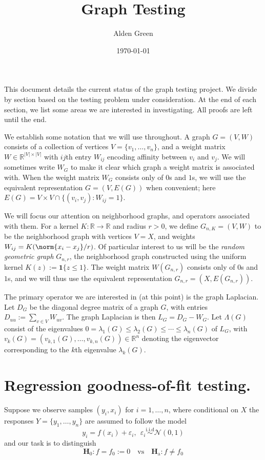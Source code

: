 \documentclass{article}
\newcommand{\Reals}{\mathbb{R}}
\newcommand{\abs}[1]{\left \lvert #1 \right \rvert}
\newcommand{\1}{\mathbf{1}}
\theoremstyle{alden}
\theoremstyle{aldenthm}
\theoremstyle{definition}
\theoremstyle{remark}
\begin{document}
\title{Graph Testing}
\author{Alden Green}
\date{\today}
\maketitle

This document details the current status of the graph testing project. We divide by section based on the testing problem under consideration. At the end of each section, we list some areas we are interested in investigating. All proofs are left until the end.

We establish some notation that we will use throughout. A graph $G = (V,W)$ consists of a collection of vertices $V = \{v_1,\ldots,v_n\}$, and a weight matrix $W \in \Reals^{\abs{V} \times \abs{V}}$ with $ij$th entry $W_{ij}$ encoding affinity between $v_i$ and $v_j$. We will sometimes write $W_G$ to make it clear which graph a weight matrix is associated with. When the weight matrix $W_G$ consists only of $0$s and $1$s, we will use the equivalent representation $G = (V,E(G))$ when convenient; here $E(G) = V \times V \cap \{(v_i,v_j): W_{ij} = 1\}$. 

We will focus our attention on neighborhood graphs, and operators associated with them. For a kernel $K:\Reals \to \Reals$ and radius $r > 0$, we define $G_{n,K}=(V,W)$ to be the neighborhood graph with vertices $V = X$, and weights $W_{ij} = K(\norm{x_i - x_j}/r)$. Of particular interest to us will be the \emph{random geometric graph} $G_{n,r}$, the neighborhood graph constructed using the uniform kernel $K(z) := \1\{z \leq 1\}$. The weight matrix $W(G_{n,r})$ consists only of $0$s and $1$s, and we will thus use the equivalent representation $G_{n,r} = (X,E(G_{n,r}))$.

The primary operator we are interested in (at this point) is the graph Laplacian. Let $D_G$ be the diagonal degree
matrix of a graph $G$, with entries $D_{uu} := \sum_{v \in V} W_{uv}$. The graph Laplacian is then $L_G = D_G - W_G$. Let $\Lambda(G)$ consist of the eigenvalues $0 = \lambda_1(G) \leq \lambda_2(G) \leq \cdots \leq \lambda_n(G)$ of $L_G$, with $v_k(G) = (v_{k,1}(G),\ldots,v_{k,n}(G)) \in \Reals^n$ denoting the eigenvector corresponding to the $k$th eigenvalue $\lambda_k(G)$.  

\section{Regression goodness-of-fit testing.}

Suppose we observe samples $(y_i,x_i)$ for $i = 1,\ldots,n$, where conditional on $X$ the responses $Y = \{y_1,\ldots,y_n\}$ are assumed to follow the model
\begin{equation}
\label{eqn:regression_known_variance}
y_i = f(x_i) + \varepsilon_i, ~~ \varepsilon_i \overset{\textrm{i.i.d}}{\sim} \mathcal{N}(0,1)
\end{equation} 
and our task is to distinguish
\begin{equation*}
\mathbf{H}_0: f = f_0 := 0 \quad \textrm{vs} \quad \mathbf{H}_{\textrm{a}}: f \neq f_0
\end{equation*}
\end{document}
